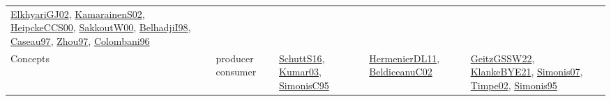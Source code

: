 {\begin{longtable}{llp{6cm}p{6cm}p{6cm}}
\href{papers/ElkhyariGJ02.pdf}{ElkhyariGJ02}\cite{ElkhyariGJ02}, \href{papers/KamarainenS02.pdf}{KamarainenS02}\cite{KamarainenS02}, \href{articles/HeipckeCCS00.pdf}{HeipckeCCS00}\cite{HeipckeCCS00}, \href{articles/SakkoutW00.pdf}{SakkoutW00}\cite{SakkoutW00}, \href{articles/BelhadjiI98.pdf}{BelhadjiI98}\cite{BelhadjiI98}, \href{papers/Caseau97.pdf}{Caseau97}\cite{Caseau97}, \href{articles/Zhou97.pdf}{Zhou97}\cite{Zhou97}, \href{papers/Colombani96.pdf}{Colombani96}\cite{Colombani96}\\
Concepts & producer consumer & \href{papers/SchuttS16.pdf}{SchuttS16}\cite{SchuttS16}, \href{papers/Kumar03.pdf}{Kumar03}\cite{Kumar03}, \href{papers/SimonisC95.pdf}{SimonisC95}\cite{SimonisC95} & \href{papers/HermenierDL11.pdf}{HermenierDL11}\cite{HermenierDL11}, \href{papers/BeldiceanuC02.pdf}{BeldiceanuC02}\cite{BeldiceanuC02} & \href{papers/GeitzGSSW22.pdf}{GeitzGSSW22}\cite{GeitzGSSW22}, \href{papers/KlankeBYE21.pdf}{KlankeBYE21}\cite{KlankeBYE21}, \href{articles/Simonis07.pdf}{Simonis07}\cite{Simonis07}, \href{articles/Timpe02.pdf}{Timpe02}\cite{Timpe02}, \href{papers/Simonis95.pdf}{Simonis95}\cite{Simonis95}\\

\end{longtable}}
